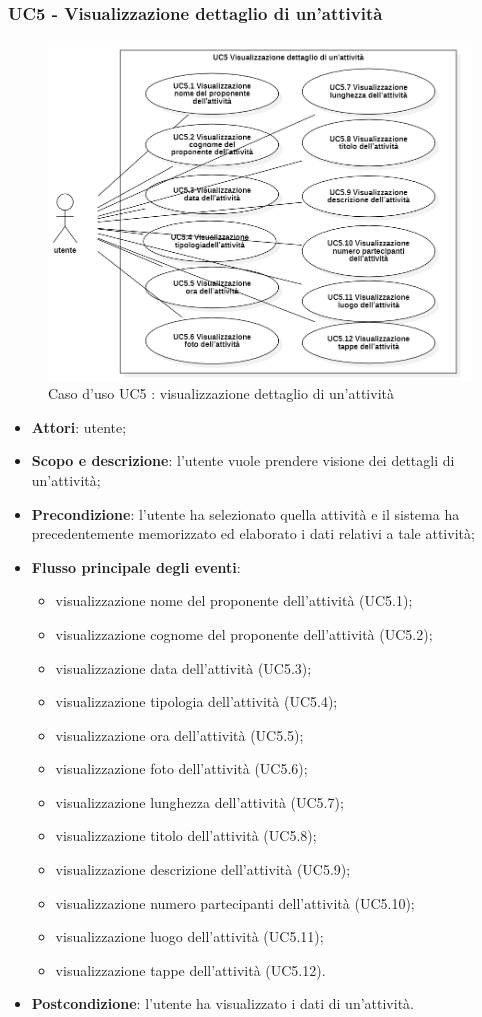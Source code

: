 \subsubsection{UC5 - Visualizzazione dettaglio di un'attività}
\begin{figure}[H]
	\centering
	\includegraphics[width=0.8\linewidth]{res/images/UC5.png}
	\caption{Caso d'uso UC5 : visualizzazione dettaglio di un'attività}
\end{figure}
\begin{itemize}
	\item \textbf{Attori}: utente;
	\item \textbf{Scopo e descrizione}: l’utente vuole prendere visione dei dettagli di un'attività;
	\item \textbf{Precondizione}: l'utente ha selezionato quella attività e il sistema ha precedentemente memorizzato ed elaborato i dati relativi a tale attività;
	\item \textbf{Flusso principale degli eventi}:
	\begin{itemize}
		\item visualizzazione nome del proponente dell’attività (UC5.1);
		\item visualizzazione cognome del proponente  dell’attività (UC5.2);
		\item visualizzazione data dell’attività (UC5.3);
		\item visualizzazione tipologia dell’attività (UC5.4);
		\item visualizzazione ora dell’attività (UC5.5);
		\item visualizzazione foto dell’attività (UC5.6);
		\item visualizzazione lunghezza dell’attività (UC5.7);
		\item visualizzazione titolo dell’attività (UC5.8);
		\item visualizzazione descrizione dell’attività (UC5.9);
		\item visualizzazione numero partecipanti dell’attività (UC5.10);
		\item visualizzazione luogo dell’attività (UC5.11);
		\item visualizzazione tappe dell’attività (UC5.12).
	\end{itemize}
	\item \textbf{Postcondizione}: l’utente ha visualizzato i dati di un'attività.
\end{itemize}


